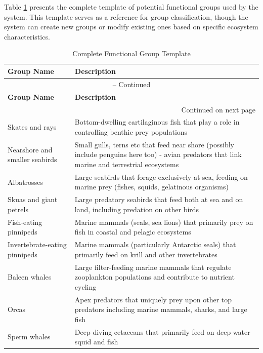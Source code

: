 \label{supp:technical_implementation}
  
  Table \ref{tab:functional_groups} presents the complete template of potential functional groups used by the system. This template serves as a reference for group classification, though the system can create new groups or modify existing ones based on specific ecosystem characteristics.
  
  \begin{longtable}{p{}p{}}
  \caption{Complete Functional Group Template\label{tab:functional_groups}} \\
  \hline
  \textbf{Group Name} & \textbf{Description} \\
  \hline
  \endfirsthead
  \multicolumn{2}{c}{{\tablename} \thetable{} -- Continued} \\
  \hline
  \textbf{Group Name} & \textbf{Description} \\
  \hline
  \endhead
  \hline
  \multicolumn{2}{r}{{Continued on next page}} \\
  \endfoot
  \hline
  \endlastfoot
  Skates and rays & Bottom-dwelling cartilaginous fish that play a role in controlling benthic prey populations \\
  Nearshore and smaller seabirds & Small gulls, terns etc that feed near shore (possibly include penguins here too) - avian predators that link marine and terrestrial ecosystems \\
  Albatrosses & Large seabirds that forage exclusively at sea, feeding on marine prey (fishes, squids, gelatinous organisms) \\
  Skuas and giant petrels & Large predatory seabirds that feed both at sea and on land, including predation on other birds \\
  Fish-eating pinnipeds & Marine mammals (seals, sea lions) that primarily prey on fish in coastal and pelagic ecosystems \\
  Invertebrate-eating pinnipeds & Marine mammals (particularly Antarctic seals) that primarily feed on krill and other invertebrates \\
  Baleen whales & Large filter-feeding marine mammals that regulate zooplankton populations and contribute to nutrient cycling \\
  Orcas & Apex predators that uniquely prey upon other top predators including marine mammals, sharks, and large fish \\
  Sperm whales & Deep-diving cetaceans that primarily feed on deep-water squid and fish \\

\end{longtable}
